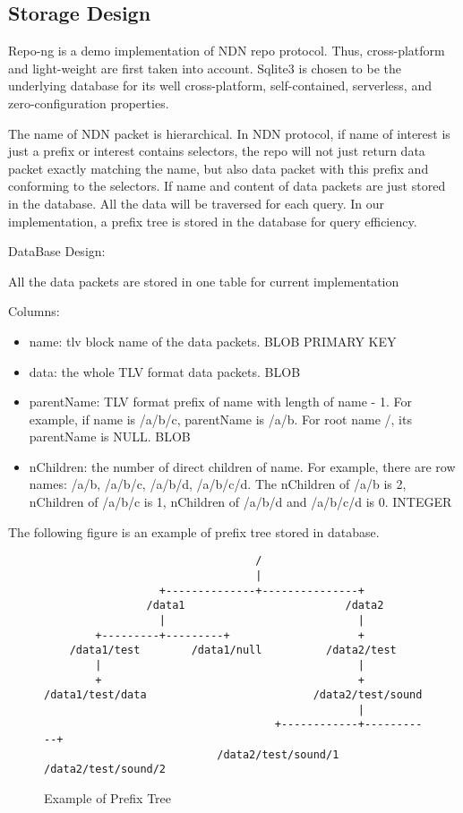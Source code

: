\documentclass{acm_proc_article-sp}
\begin{document}
\subsection{Storage Design}
Repo-ng is a demo implementation of NDN repo protocol. Thus, cross-platform and light-weight are first taken into account. Sqlite3 is chosen to be the underlying database for its well cross-platform, self-contained, serverless, and zero-configuration properties.

The name of NDN packet is hierarchical. In NDN protocol, if name of interest is just a prefix or interest contains selectors, the repo will not just return data packet exactly matching the name, but also data packet with this prefix and conforming to the selectors. If name and content of data packets are just stored in the database. All the data will be traversed for each query. In our implementation, a prefix tree is stored in the database for query efficiency.

DataBase Design:

All the data packets are stored in one table for current implementation

Columns:
\begin{itemize}
\item name: tlv block name of the data packets. BLOB PRIMARY KEY
\item data: the whole TLV format data packets. BLOB
\item parentName: TLV format prefix of name with length of name - 1. For example, if name is /a/b/c, parentName is /a/b. For root name /, its parentName is NULL. BLOB
\item nChildren: the number of direct children of name. For example, there are row names: /a/b, /a/b/c, /a/b/d, /a/b/c/d. The nChildren of /a/b is 2, nChildren of /a/b/c is 1, nChildren of /a/b/d and /a/b/c/d is 0. INTEGER
\end{itemize}

The following figure is an example of prefix tree stored in database.

\begin{figure*}
\centering
\begin{BVerbatim}
                                 / 
                                 |          
                  +--------------+---------------+
                /data1                         /data2
                  |                              |         
        +---------+---------+                    +
    /data1/test        /data1/null          /data2/test
        |                                        |
        +                                        +
/data1/test/data                          /data2/test/sound
                                                 |
                                    +------------+-----------+
                           /data2/test/sound/1      /data2/test/sound/2

\end{BVerbatim}
\caption{Example of Prefix Tree}
\end{figure*}
\end{document}
